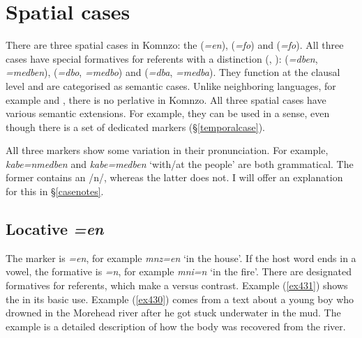 \section{Spatial cases} \label{spatialcase}

There are three spatial cases in Komnzo: the  (\emph{=en}),  (\emph{=fo}) and  (\emph{=fo}). All three cases have special formatives for  referents with a  distinction (\Sg{}, \Nsg{}):  (\emph{=dben}, \emph{=medben}),  (\emph{=dbo}, \emph{=medbo}) and  (\emph{=dba}, \emph{=medba}). They function at the clausal level and are categorised as semantic cases. Unlike neighboring languages, for example  and , there is no perlative  in Komnzo. All three spatial cases have various semantic extensions. For example, they can be used in a  sense, even though there is a set of dedicated   markers (\S{}\ref{temporalcase}).%

All three    markers show some variation in their pronunciation. For example, \emph{kabe=nmedben} and \emph{kabe=medben} `with/at the people' are both grammatical. The former contains an /n/, whereas the latter does not. I will offer an explanation for this in \S{}\ref{casenotes}.

\subsection{Locative \emph{=en}} \label{locativecase}

The   marker is \emph{=en}, for example \emph{mnz=en} `in the house'. If the host word ends in a vowel, the formative is \emph{=n}, for example \emph{mni=n} `in the fire'. There are designated formatives for  referents, which make a  versus  contrast. Example (\ref{ex431}) shows the   in its basic use. Example (\ref{ex430}) comes from a text about a young boy who drowned in the Morehead river after he got stuck underwater in the mud. The example is a detailed description of how the body was recovered from the river.

